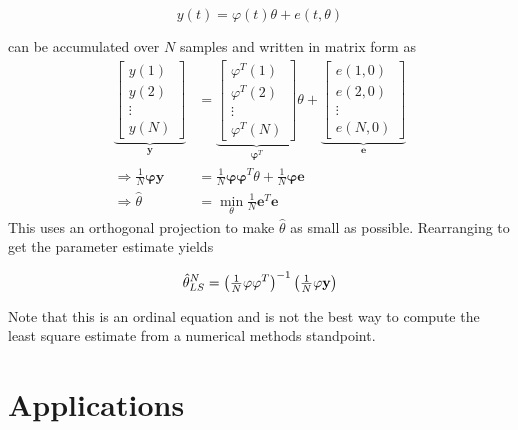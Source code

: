\begin{equation*}
y(t) = \varphi(t)\theta + e(t,\theta)
\end{equation*}

can be accumulated over $N$ samples and written in matrix form as
\begin{align*}
\underbrace{\left[\begin{array}{c} y(1) \\ y(2) \\ \vdots \\ y(N) \end{array}\right]}_{\mathbf{y}} &= \underbrace{\left[\begin{array}{c} \varphi^T(1) \\ \varphi^T(2) \\ \vdots \\ \varphi^T(N) \end{array}\right]}_{\mathbf{\varphi}^T} \theta
+ \underbrace{\left[\begin{array}{c} e(1,0) \\ e(2,0) \\ \vdots \\ e(N,0) \end{array}\right]}_{\mathbf{e}} \\
\Rightarrow \tfrac{1}{N}\mathbf{\varphi}\mathbf{y} &= \tfrac{1}{N}\mathbf{\varphi}\mathbf{\varphi}^T\theta + \tfrac{1}{N}\mathbf{\varphi}\mathbf{e} \\
\Rightarrow \hat{\theta} &= \min_\theta \tfrac{1}{N}\mathbf{e}^T\mathbf{e}
\end{align*}
This uses an orthogonal projection to make $\hat{\theta}$ as small as possible.
Rearranging to get the parameter estimate yields

\begin{equation*}
\hat{\theta}_{LS}^N = {\left(\tfrac{1}{N}\mathbf{\varphi\varphi}^T\right)}^{-1} \left(\tfrac{1}{N}\mathbf{\varphi y}\right)
\end{equation*}

Note that this is an ordinal equation and is not the best way to compute the least square estimate from a numerical methods standpoint.

\section{Applications}

